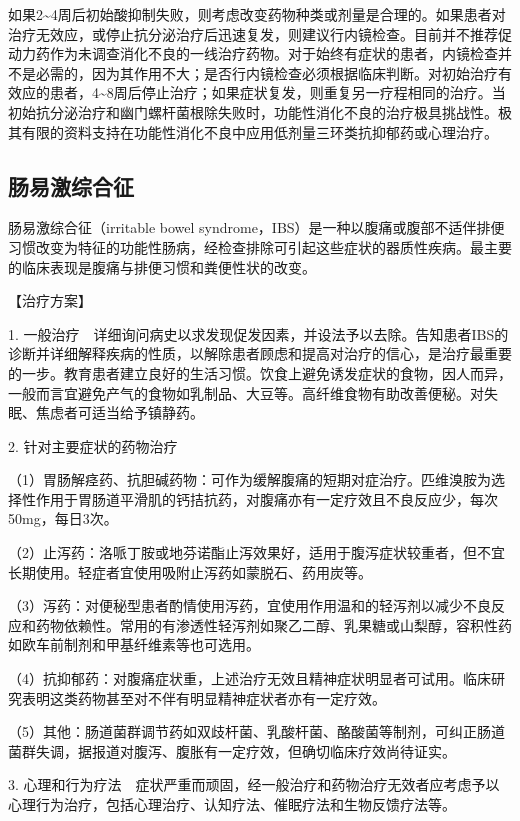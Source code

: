如果2\textasciitilde{}4周后初始酸抑制失败，则考虑改变药物种类或剂量是合理的。如果患者对治疗无效应，或停止抗分泌治疗后迅速复发，则建议行内镜检查。目前并不推荐促动力药作为未调查消化不良的一线治疗药物。对于始终有症状的患者，内镜检查并不是必需的，因为其作用不大；是否行内镜检查必须根据临床判断。对初始治疗有效应的患者，4\textasciitilde{}8周后停止治疗；如果症状复发，则重复另一疗程相同的治疗。当初始抗分泌治疗和幽门螺杆菌根除失败时，功能性消化不良的治疗极具挑战性。极其有限的资料支持在功能性消化不良中应用低剂量三环类抗抑郁药或心理治疗。

\subsection{肠易激综合征}

肠易激综合征（irritable bowel
syndrome，IBS）是一种以腹痛或腹部不适伴排便习惯改变为特征的功能性肠病，经检查排除可引起这些症状的器质性疾病。最主要的临床表现是腹痛与排便习惯和粪便性状的改变。

【治疗方案】

1.
一般治疗　详细询问病史以求发现促发因素，并设法予以去除。告知患者IBS的诊断并详细解释疾病的性质，以解除患者顾虑和提高对治疗的信心，是治疗最重要的一步。教育患者建立良好的生活习惯。饮食上避免诱发症状的食物，因人而异，一般而言宜避免产气的食物如乳制品、大豆等。高纤维食物有助改善便秘。对失眠、焦虑者可适当给予镇静药。

2. 针对主要症状的药物治疗

（1）胃肠解痉药、抗胆碱药物：可作为缓解腹痛的短期对症治疗。匹维溴胺为选择性作用于胃肠道平滑肌的钙拮抗药，对腹痛亦有一定疗效且不良反应少，每次50mg，每日3次。

（2）止泻药：洛哌丁胺或地芬诺酯止泻效果好，适用于腹泻症状较重者，但不宜长期使用。轻症者宜使用吸附止泻药如蒙脱石、药用炭等。

（3）泻药：对便秘型患者酌情使用泻药，宜使用作用温和的轻泻剂以减少不良反应和药物依赖性。常用的有渗透性轻泻剂如聚乙二醇、乳果糖或山梨醇，容积性药如欧车前制剂和甲基纤维素等也可选用。

（4）抗抑郁药：对腹痛症状重，上述治疗无效且精神症状明显者可试用。临床研究表明这类药物甚至对不伴有明显精神症状者亦有一定疗效。

（5）其他：肠道菌群调节药如双歧杆菌、乳酸杆菌、酪酸菌等制剂，可纠正肠道菌群失调，据报道对腹泻、腹胀有一定疗效，但确切临床疗效尚待证实。

3.
心理和行为疗法　症状严重而顽固，经一般治疗和药物治疗无效者应考虑予以心理行为治疗，包括心理治疗、认知疗法、催眠疗法和生物反馈疗法等。

